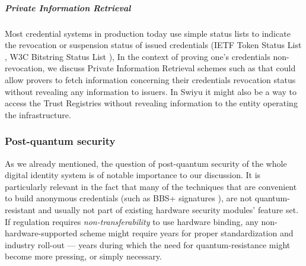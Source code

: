 \subparagraph{Private Information Retrieval} Most credential systems in production today use simple status lists to indicate the revocation or suspension status of issued credentials (IETF Token Status List \cite{TSL}, W3C Bitstring Status List \cite{W3C-status-lists}), In the context of proving one's credentials non-revocation, we discuss Private Information Retrieval schemes such as \cite{MW22} that could allow provers to fetch information concerning their credentials revocation status without revealing any information to issuers. In Swiyu \cite{Swiyu} it might also be a way to access the Trust Registries without revealing information to the entity operating the infrastructure.

\subsubsection{Post-quantum security} As we already mentioned, the question of post-quantum security of the whole digital identity system is of notable importance to our discussion.
It is particularly relevant in the fact that many of the techniques that are convenient to build anonymous credentials (such as BBS+ signatures \cite{ASM06}), are not quantum-resistant and usually not part of existing hardware security modules' feature set. If regulation requires \emph{non-transferability} to use hardware binding, any non-hardware-supported scheme might require years for proper standardization and industry roll-out --- years during which the need for quantum-resistance might become more pressing, or simply necessary.

